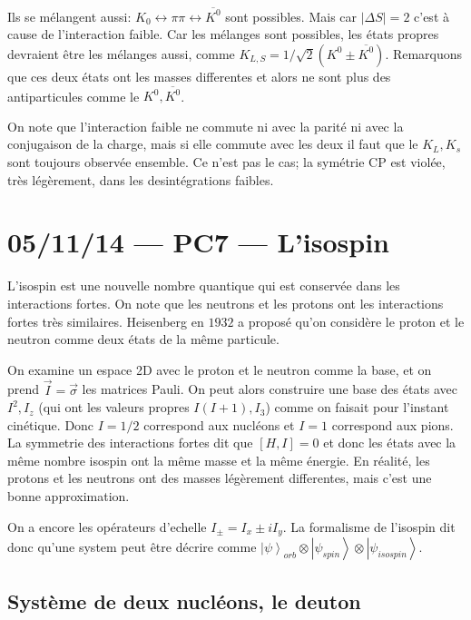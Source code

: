 \documentclass[10pt]{report}
\newcommand{\ket}[1]{\left|#1\right>}
\newcommand{\abs}[1]{\left|#1\right|}
\begin{document}
Ils se m\'elangent aussi: $K_0 \leftrightarrow \pi \pi \leftrightarrow \overline{K^0}$ sont possibles. Mais car $\abs{\Delta S} = 2$ c'est \`a cause de l'interaction faible. Car les m\'elanges sont possibles, les \'etats propres devraient \^etre les m\'elanges aussi, comme $K_{L,S} = 1/\sqrt{2}\left( K^0 \pm \overline{K^0} \right)$. Remarquons que ces deux \'etats ont les masses differentes et alors ne sont plus des antiparticules comme le $K^0, \overline{K^0}$.

On note que l'interaction faible ne commute ni avec la parit\'e ni avec la conjugaison de la charge, mais si elle commute avec les deux il faut que le $K_L, K_s$ sont toujours observ\'ee ensemble. Ce n'est pas le cas; la sym\'etrie CP est viol\'ee, tr\`es l\'eg\`erement, dans les desint\'egrations faibles.
\chapter{05/11/14 --- PC7 --- L'isospin}

L'isospin est une nouvelle nombre quantique qui est conserv\'ee dans les interactions fortes. On note que les neutrons et les protons ont les interactions fortes tr\`es similaires. Heisenberg en $1932$ a propos\'e qu'on consid\`ere le proton et le neutron comme deux \'etats de la m\^eme particule. 

On examine un espace 2D avec le proton et le neutron comme la base, et on prend $\vec{I} = \vec{\sigma}$ les matrices Pauli. On peut alors construire une base des \'etats avec $I^2, I_z$ (qui ont les valeurs propres $I(I+1), I_3$) comme on faisait pour l'instant cin\'etique. Donc $I = 1/2$ correspond aux nucl\'eons et $I=1$ correspond aux pions. La symmetrie des interactions fortes dit que $[H,I] = 0$ et donc les \'etats avec la m\^eme nombre isospin ont la m\^eme masse et la m\^eme \'energie. En r\'ealit\'e, les protons et les neutrons ont des masses l\'eg\`erement differentes, mais c'est une bonne approximation.

On a encore les op\'erateurs d'echelle $I_{\pm} = I_x \pm iI_y$. La formalisme de l'isospin dit donc qu'une system peut \^etre d\'ecrire comme $\ket{\psi}_{orb} \otimes \ket{\psi_{spin}} \otimes \ket{\psi_{isospin}}$.

\section{Syst\`eme de deux nucl\'eons, le deuton}
\end{document}
